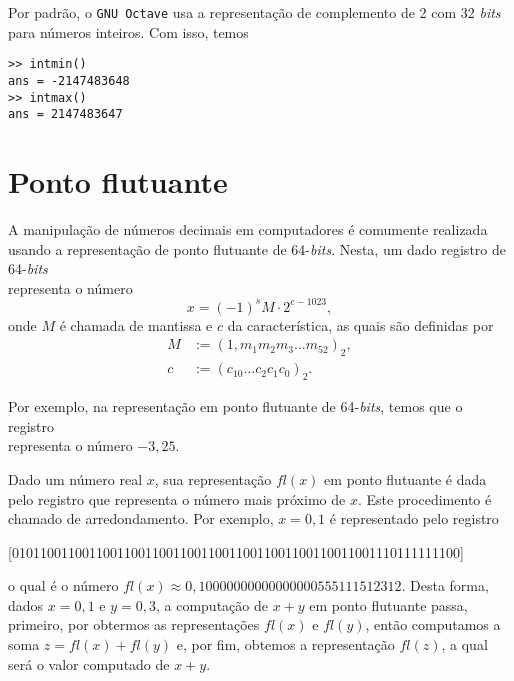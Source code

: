 \ifisoctave
\begin{obs}
  Por padrão, o \verb+GNU Octave+ usa a representação de complemento de 2 com 32 {\it bits} para números inteiros. Com isso, temos
\begin{verbatim}
>> intmin()
ans = -2147483648
>> intmax()
ans = 2147483647
\end{verbatim}
\end{obs}
\fi

\section{Ponto flutuante}

A manipulação de números decimais em computadores é comumente realizada usando a representação de ponto flutuante de 64-{\it bits}. Nesta, um dado registro de 64-{\it bits}
\begin{equation}
  [m_{52} ~ m_{51} ~ m_{50} ~ \cdots ~ m_{1} ~ | ~ c_0 ~ c_1 ~ c_2 ~ \cdots ~ c_{10} ~ | ~ s]
\end{equation}
representa o número
\begin{equation}
  x = (-1)^s M\cdot 2^{c - 1023},
\end{equation}
onde $M$ é chamada de mantissa e $c$ da característica, as quais são definidas por
\begin{align}
  M &:= (1,m_1m_2m_3\ldots m_{52})_2,\\
  c &:= (c_{10}\ldots c_2c_1c_0)_2.
\end{align}

\begin{ex}
  Por exemplo, na representação em ponto flutuante de 64-{\it bits}, temos que o registro
  \begin{equation}
    [0 ~ 0 ~ 0 ~ \cdots ~ 0 ~ 1 ~ 0 ~ 1 ~ | ~ 0 ~ 0 ~ 0 ~ \cdots ~ 0 ~ 1 ~ | ~ 1]
  \end{equation}
representa o número $-3,25$.
\end{ex}

Dado um número real $x$, sua representação $fl(x)$ em ponto flutuante é dada pelo registro que representa o número mais próximo de $x$. Este procedimento é chamado de arredondamento. Por exemplo, $x = 0,1$ é representado pelo registro
\begin{small}
\begin{center}
[0101100110011001100110011001100110011001100110011001110111111100]
\end{center}
\end{small}
o qual é o número $fl(x) \approx 0,10000000000000000555111512312$. Desta forma, dados $x=0,1$ e $y=0,3$, a computação de $x + y$ em ponto flutuante passa, primeiro, por obtermos as representações $fl(x)$ e $fl(y)$, então computamos a soma $z = fl(x)+fl(y)$ e, por fim, obtemos a representação $fl(z)$, a qual será o valor computado de $x + y$.

\emconstrucao